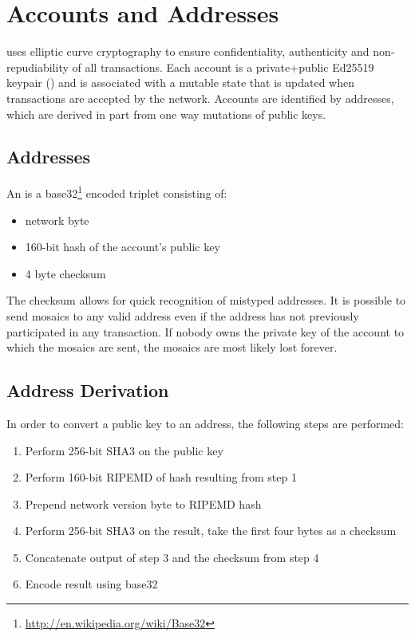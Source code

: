 \section{Accounts and Addresses}
\label{sec:accounts}

\nemquote{
}{}

\codenamechapterfirstword uses elliptic curve cryptography to ensure confidentiality, authenticity and non-repudiability of all transactions.
Each account is a private+public Ed25519 keypair () and is associated with a mutable state that is updated when transactions are accepted by the network.
Accounts are identified by addresses, which are derived in part from one way mutations of public keys.

\subsection{Addresses}

An  is a base32\footnote{ \url{http://en.wikipedia.org/wiki/Base32} } encoded triplet consisting of:
\begin{itemize}
	\item{network byte}
	\item{160-bit hash of the account's public key}
	\item{4 byte checksum}
\end{itemize}

The checksum allows for quick recognition of mistyped addresses.
It is possible to send mosaics to any valid address even if the address has not previously participated in any transaction.
If nobody owns the private key of the account to which the mosaics are sent, the mosaics are most likely lost forever.

\subsection{Address Derivation}
In order to convert a public key to an address, the following steps are performed:
\begin{enumerate}
	\item{Perform 256-bit SHA3 on the public key}
	\item{Perform 160-bit RIPEMD of hash resulting from step 1}
	\item{Prepend network version byte to RIPEMD hash}
	\item{Perform 256-bit SHA3 on the result, take the first four bytes as a checksum}
	\item{Concatenate output of step 3 and the checksum from step 4}
	\item{Encode result using base32}
\end{enumerate}

